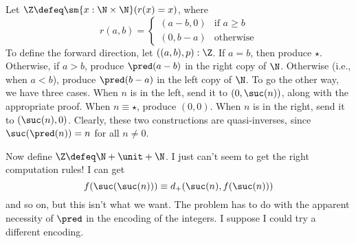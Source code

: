  \soln
Let $\Z \defeq \sm{x : \N \times \N} (r(x) = x)$, where
\[
  r(a, b) = \begin{cases}
    (a - b, 0) & \text{if $a \geq b$} \\
    (0, b - a) & \text{otherwise}
 \end{cases}
\]
To define the forward direction, let $((a, b), p) : \Z$.  If $a = b$, then
produce $\star$.  Otherwise, if $a > b$, produce $\pred(a - b)$ in the right
copy of $\N$.  Otherwise (i.e., when $a < b$), produce $\pred(b - a)$ in the
left copy of $\N$.  To go the other way, we have three cases.  When $n$ is
in the left, send it to $(0, \suc(n))$, along with the appropriate proof.  When
$n \equiv \star$, produce $(0, 0)$.  When $n$ is in the right, send it to
$(\suc(n), 0)$.  Clearly, these two constructions are quasi-inverses, since
$\suc(\pred(n)) = n$ for all $n \neq 0$.


Now define $\Z \defeq \N + \unit + \N$.  I just can't seem to get the right
computation rules!  I can get
\[
  f(\suc(\suc(n)))
  \equiv
  d_{+}(\suc(n), f(\suc(n)))
\]
and so on, but this isn't what we want.  The problem has to do with the
apparent necessity of $\pred$ in the encoding of the integers.  I suppose I
could try a different encoding.


